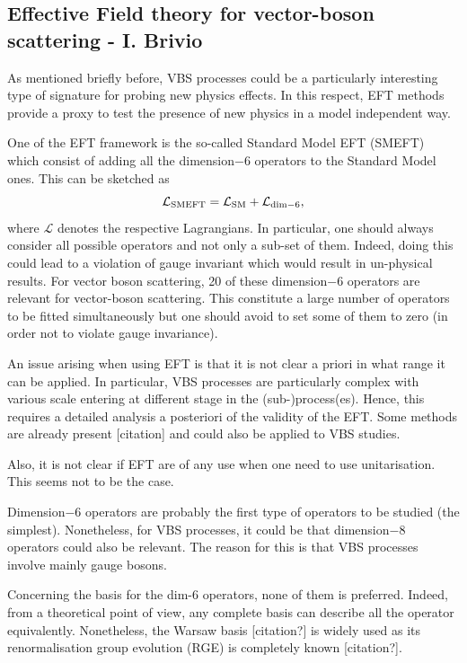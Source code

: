 \subsection{Effective Field theory for vector-boson scattering - I. Brivio}

As mentioned briefly before, VBS processes could be a particularly interesting type of signature for probing new physics effects.
In this respect, EFT methods provide a proxy to test the presence of new physics in a model independent way.

One of the EFT framework is the so-called Standard Model EFT (SMEFT) which consist of adding all the dimension$-6$ operators to the Standard Model ones.
This can be sketched as
%
\begin{equation}
 \mathcal{L}_{\rm SMEFT} = \mathcal{L}_{\rm SM} + \mathcal{L}_{\rm dim-6},
\end{equation}
%
where $\mathcal{L}$ denotes the respective Lagrangians.
In particular, one should always consider all possible operators and not only a sub-set of them.
Indeed, doing this could lead to a violation of gauge invariant which would result in un-physical results.
For vector boson scattering, 20 of these dimension$-6$ operators are relevant for vector-boson scattering.
This constitute a large number of operators to be fitted simultaneously but one should avoid to set some of them to zero (in order not to violate gauge invariance).

An issue arising when using EFT is that it is not clear a priori in what range it can be applied.
In particular, VBS processes are particularly complex with various scale entering at different stage in the (sub-)process(es).
Hence, this requires a detailed analysis a posteriori of the validity of the EFT.
Some methods are already present [citation] and could also be applied to VBS studies.

Also, it is not clear if EFT are of any use when one need to use unitarisation.
This seems not to be the case.

Dimension$-6$ operators are probably the first type of operators to be studied (the simplest).
Nonetheless, for VBS processes, it could be that dimension$-8$ operators could also be relevant.
The reason for this is that VBS processes involve mainly gauge bosons.

Concerning the basis for the dim-$6$ operators, none of them is preferred.
Indeed, from a theoretical point of view, any complete basis can describe all the operator equivalently.
Nonetheless, the Warsaw basis [citation?] is widely used as its renormalisation group evolution (RGE) is completely known [citation?].

